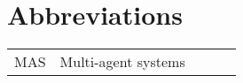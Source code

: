 \chapter*{Abbreviations}

\begin{flushleft}
\begin{tabular}{l p{0.8\linewidth}}
MAS      & Multi-agent systems\\

\end{tabular}
\end{flushleft}

